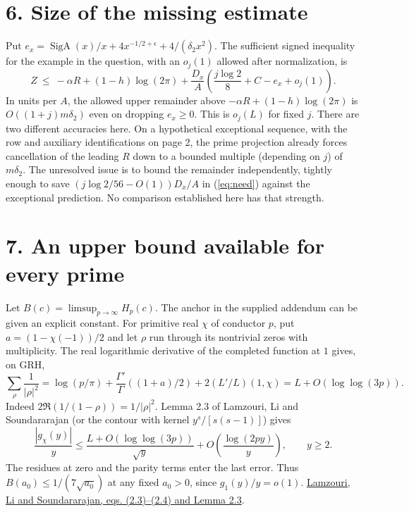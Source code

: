 \documentclass[11pt]{article}
\newcommand{\Sig}{\operatorname{SigA}}
\begin{document}
\section*{6. Size of the missing estimate}
Put $e_x=\Sig(x)/x+4x^{-1/2+\epsilon}+4/(\delta_2x^2)$. The sufficient signed inequality for the example in the question, with an $o_j(1)$ allowed after normalization, is
\begin{equation}
 Z\ \le\ -\alpha R+(1-h)\log(2\pi)
       +\frac{D_x}{A}\left(\frac{j\log2}{8}+C-e_x+o_j(1)\right).
 \label{eq:need}
\end{equation}
In units per $A$, the allowed upper remainder above $-\alpha R+(1-h)\log(2\pi)$ is $O((1+j)m\delta_2)$ even on dropping $e_x\ge0$. This is $o_j(L)$ for fixed $j$. There are two different accuracies here. On a hypothetical exceptional sequence, with the row and auxiliary identifications on page 2, the prime projection already forces cancellation of the leading $R$ down to a bounded multiple (depending on $j$) of $m\delta_2$. The unresolved issue is to bound the remainder independently, tightly enough to save $(j\log2/56-O(1))D_x/A$ in (\ref{eq:need}) against the exceptional prediction. No comparison established here has that strength.

\newpage
\section*{7. An upper bound available for every prime} Let $B(c)=\limsup_{p\to\infty}H_p(c)$. The anchor in the supplied addendum can be given an explicit constant. For primitive real $\chi$ of conductor $p$, put $a=(1-\chi(-1))/2$ and let $\rho$ run through its nontrivial zeros with multiplicity. The real logarithmic derivative of the completed function at $1$ gives, on GRH,
\[
 \sum_\rho\frac1{|\rho|^2}
 =\log(p/\pi)+\frac{\Gamma'}{\Gamma}((1+a)/2)
                  +2(L'/L)(1,\chi)=L+O(\log\log(3p)).
\]
Indeed $2\Re(1/(1-\rho))=1/|\rho|^2$. Lemma 2.3 of Lamzouri, Li and Soundararajan (or the contour with kernel $y^s/[s(s-1)]$) gives
\[
 \frac{|g_\chi(y)|}{y}\le
    \frac{L+O(\log\log(3p))}{\sqrt y}
       +O\!\left(\frac{\log(2py)}{y}\right),\qquad y\ge2.
\]
The residues at zero and the parity terms enter the last error. Thus $B(a_0)\le1/(7\sqrt{a_0})$ at any fixed $a_0>0$, since $g_1(y)/y=o(1)$.
\href{https://arxiv.org/pdf/1309.3595}{Lamzouri, Li and Soundararajan, eqs. (2.3)--(2.4) and Lemma 2.3}.
\end{document}
